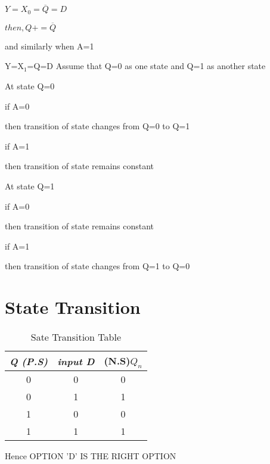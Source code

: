 \documentclass[standalone]{article}
\begin{document}
    $ Y=X_0=\overline{Q}=D$
     
    $ then,Q+  =\overline{Q}$
    
    and  similarly  when  A=1
    
    Y=X$_1$=Q=D
   Assume   that  Q=0  as one  state and Q=1  as another state
   
   At  state Q=0
   
    if  A=0
    
    then transition of state changes from Q=0 to Q=1
    
    if A=1
    
    then transition of state remains constant
    
   At  state  Q=1
   
    if  A=0
    
    then transition of state remains constant
    
    if A=1
    
    then transition of state changes from Q=1 to Q=0
    
\section{State Transition}  
  \begin{table}[h]
   \centering
   \begin{tabular}{|c|c|c|}
   \hline
   \textit{\textbf{Q (P.S) }}&\textit{\textbf{input D}} &\textbf{(N.S)$Q_n$} \\ \hline
    0 & 0    &  0     \\ \hline
    0 & 1    &  1     \\ \hline
    1 & 0    &  0     \\\hline
    1 & 1    &  1     \\ \hline
    \hline
   \end{tabular}
  \caption{Sate Transition Table }
\label{tab:table1}
\end{table}
 
    
    
    Hence  OPTION 'D' IS THE RIGHT OPTION
    
\begin{figure}[h]
    \centering
     
\end{figure}
\end{document}
